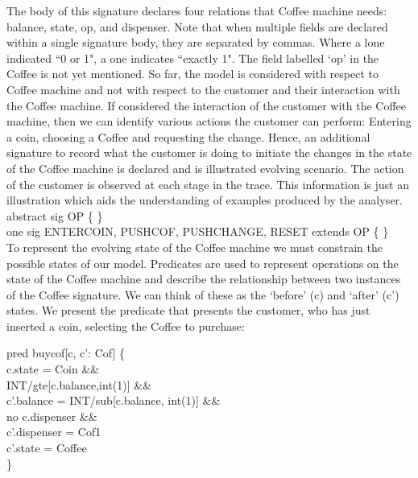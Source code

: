\documentclass[a4paper,12pt]{extarticle}
\begin{document}
The body of this signature declares four relations that Coffee machine needs: balance, state, op, and dispenser. Note that when multiple fields are declared within a single signature body, they are separated by commas. Where a lone indicated ``0 or 1", a one indicates ``exactly 1". The field labelled `op’ in the Coffee is not yet mentioned. So far, the model is considered with respect to Coffee machine and not with respect to the customer and their interaction with the Coffee machine. If considered the interaction of the customer with the Coffee machine, then we can identify various actions the customer can perform: Entering a coin, choosing a Coffee and requesting the change. Hence, an additional signature to record what the customer is doing to initiate the changes in the state of the Coffee machine is declared and is illustrated evolving scenario. The action of the customer is observed at each stage in the trace. This information is just an illustration which aids the understanding of examples produced by the analyser. \\
	
abstract sig OP \{ \}\\
one sig ENTERCOIN, PUSHCOF, PUSHCHANGE, RESET extends OP \{ \}\\

To represent the evolving state of the Coffee machine we must constrain the possible states of our model. Predicates are used to represent operations on the state of the Coffee machine and describe the relationship between two instances of the Coffee signature. We can think of these as the `before' (c) and `after' (c') states. We present the predicate that presents the customer, who has just inserted a coin, selecting the Coffee to purchase:\\
\begin{algorithm}

pred buycof[c, c': Cof] \{ \\
 
c.state = Coin \&\& \\
INT/gte[c.balance,int(1)] \&\& \\
c'.balance = INT/sub[c.balance, int(1)] \&\& \\
no c.dispenser \&\& \\
c'.dispenser = Cof1\\
c'.state = Coffee\\

\}\\
\end{algorithm}
\end{document}
